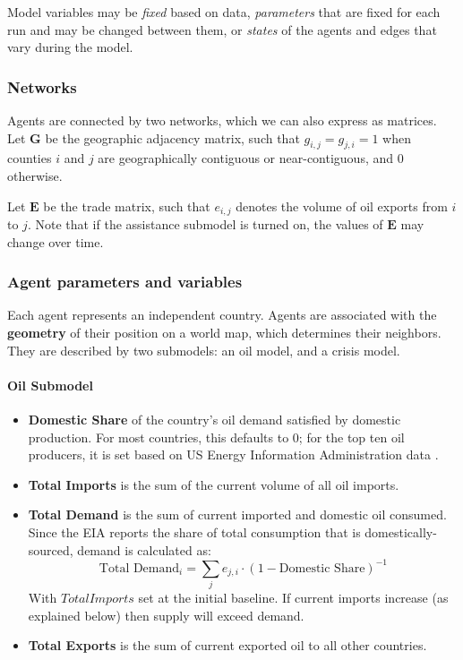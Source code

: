 \documentclass{article}
\begin{document}
Model variables may be \emph{fixed} based on data, \emph{parameters} that are fixed for each run and may be changed between them, or \emph{states} of the agents and edges that vary during the model.

\subsubsection{Networks}

Agents are connected by two networks, which we can also express as matrices. Let $\mathbf{G}$ be the geographic adjacency matrix, such that $g_{i,j}=g_{j,i}=1$ when counties $i$ and $j$ are geographically contiguous or near-contiguous, and $0$ otherwise. 

Let $\mathbf{E}$ be the trade matrix, such that $e_{i,j}$ denotes the volume of oil exports from $i$ to $j$. Note that if the assistance submodel is turned on, the values of $\mathbf{E}$ may change over time.

\subsubsection{Agent parameters and variables}

Each agent represents an independent country. Agents are associated with the \textbf{geometry} of their position on a world map, which determines their neighbors. They are described by two submodels: an oil model, and a crisis model.

\paragraph{Oil Submodel}
\begin{itemize}
	\item \textbf{Domestic Share} of the country's oil demand satisfied by domestic production. For most countries, this defaults to 0; for the top ten oil producers, it is set based on US Energy Information Administration data \citep{}.
	\item \textbf{Total Imports} is the sum of the current volume of all oil imports. 
	\item \textbf{Total Demand} is the sum of current imported and domestic oil consumed. Since the EIA reports the share of total consumption that is domestically-sourced, demand is calculated as: $$\text{Total Demand}_i = \sum_j e_{j,i} \cdot (1 - \text{Domestic Share})^{-1}$$
	With $Total Imports$ set at the initial baseline. If current imports increase (as explained below) then supply will exceed demand. 
	\item \textbf{Total Exports} is the sum of current exported oil to all other countries.
\end{itemize}
\end{document}
